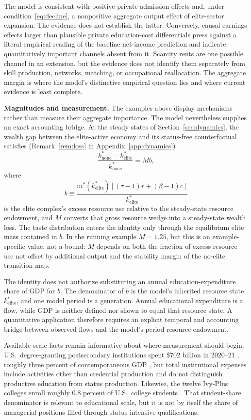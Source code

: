 \documentclass[12pt,letterpaper]{article}
\theoremstyle{definition}
\begin{document}
The model is consistent with positive private admission effects and, under condition~\eqref{eq:decline}, a nonpositive aggregate output effect of elite-sector expansion.
The evidence does not establish the latter.
Conversely, causal earnings effects larger than plausible private education-cost differentials press against a literal empirical reading of the baseline net-income prediction and indicate quantitatively important channels absent from it.
Scarcity rents are one possible channel in an extension, but the evidence does not identify them separately from skill production, networks, matching, or occupational reallocation.
The aggregate margin is where the model's distinctive empirical question lies and where current evidence is least complete.

\textbf{Magnitudes and measurement.}
The examples above display mechanisms rather than measure their aggregate importance.
The model nevertheless supplies an exact accounting bridge.
At the steady states of Section~\ref{sec:dynamics}, the wealth gap between the elite-active economy and its status-free counterfactual satisfies (Remark~\ref{rem:loss} in Appendix~\ref{app:dynamics})
\[
\frac{k^\ast_{\mathrm{none}}-k^\ast_{\mathrm{elite}}}
     {k^\ast_{\mathrm{none}}}
=
M b,
\]
where
\[
b
\equiv
\frac{
m^\ast(k^\ast_{\mathrm{elite}})
\left[(\tau-1)r+(\beta-1)c\right]
}{
k^\ast_{\mathrm{elite}}
}
\]
is the elite complex's excess resource use relative to the steady-state resource endowment, and $M$ converts that gross resource wedge into a steady-state wealth loss.
The taste distribution enters the identity only through the equilibrium elite mass contained in $b$.
In the running example $M=1.25$, but this is an example-specific value, not a bound: $M$ depends on both the fraction of excess resource use not offset by additional output and the stability margin of the no-elite transition map.

The identity does not authorize substituting an annual education-expenditure share of GDP for $b$.
The denominator of $b$ is the model's inherited resource state $k^\ast_{\mathrm{elite}}$, and one model period is a generation.
Annual educational expenditure is a flow, while GDP is neither defined nor shown to equal that resource state.
A quantitative application therefore requires an explicit temporal and accounting bridge between observed flows and the model's period resource endowment.

Available scale facts remain informative about where measurement should begin.
U.S.\ degree-granting postsecondary institutions spent \$702 billion in 2020--21 \citep{nces2023expenses}, roughly three percent of contemporaneous GDP \citep{bea2022gdp}, but total institutional expenses include activities other than credential production and do not distinguish productive education from status production.
Likewise, the twelve Ivy-Plus colleges enroll roughly $0.8$ percent of U.S.\ college students \citep{chettydemingfriedman2026}.
That student-share denominator is relevant to educational scale, but it is not by itself the share of managerial positions filled through status-intensive qualifications.
\end{document}
